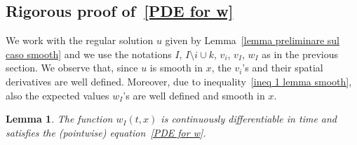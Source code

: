 \documentclass[a4paper,10pt]{article}
\newtheorem{lemma}[theorem]{Lemma}
\begin{document}
\subsection{Rigorous proof of~\eqref{PDE for w}}
\label{section_rigorous_w}

We work with the regular solution $u$ given by Lemma~\ref{lemma preliminare sul caso smooth} and we use the notations $I$, $I\setminus i\cup k$, $v_{i}$, $v_{I}$, $w_{I}$ as in the previous section. We observe that, since $u$ is smooth in $x$, the $v_{i}$'s and their spatial derivatives are well defined. Moreover, due to inequality~\eqref{ineq 1 lemma smooth}, also the expected values $w_{I}$'s are well defined and smooth in $x$.

\begin{lemma}
The function $w_{I}(t,x)$ is continuously differentiable in
time and satisfies the (pointwise) equation~\eqref{PDE for w}.
\end{lemma}
\end{document}
